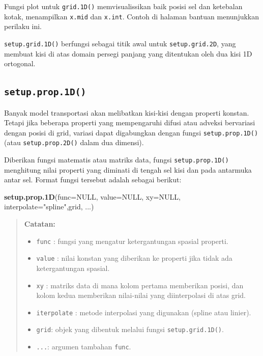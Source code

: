 \documentclass[]{book}
\newenvironment{Shaded}{\begin{snugshade}}{\end{snugshade}}
\newcommand{\DataTypeTok}[1]{\textcolor[rgb]{0.13,0.29,0.53}{#1}}
\newcommand{\KeywordTok}[1]{\textcolor[rgb]{0.13,0.29,0.53}{\textbf{#1}}}
\newcommand{\NormalTok}[1]{#1}
\newcommand{\OtherTok}[1]{\textcolor[rgb]{0.56,0.35,0.01}{#1}}
\newcommand{\StringTok}[1]{\textcolor[rgb]{0.31,0.60,0.02}{#1}}
\providecommand{\tightlist}{%
  \setlength{\itemsep}{0pt}\setlength{\parskip}{0pt}}
\theoremstyle{definition}
\theoremstyle{definition}
\theoremstyle{definition}
\theoremstyle{remark}
\begin{document}
Fungsi plot untuk \texttt{grid.1D()} memvisualissikan baik posisi sel dan ketebalan kotak, menampilkan \texttt{x.mid} dan \texttt{x.int}. Contoh di halaman bantuan menunjukkan perilaku ini.

\texttt{setup.grid.1D()} berfungsi sebagai titik awal untuk \texttt{setup.grid.2D}, yang membuat kisi di atas domain persegi panjang yang ditentukan oleh dua kisi 1D ortogonal.

\hypertarget{setup.prop.1d}{%
\subsection{\texorpdfstring{\texttt{setup.prop.1D()}}{setup.prop.1D()}}\label{setup.prop.1d}}

Banyak model transportasi akan melibatkan kisi-kisi dengan properti konstan. Tetapi jika beberapa properti yang mempengaruhi difusi atau adveksi bervariasi dengan posisi di grid, variasi dapat digabungkan dengan fungsi \texttt{setup.prop.1D()} (atau \texttt{setup.prop.2D()} dalam dua dimensi).

Diberikan fungsi matematis atau matriks data, fungsi \texttt{setup.prop.1D()} menghitung nilai properti yang diminati di tengah sel kisi dan pada antarmuka antar sel. Format fungsi tersebut adalah sebagai berikut:

\begin{Shaded}
\begin{Highlighting}[]
\KeywordTok{setup.prop.1D}\NormalTok{(}\DataTypeTok{func=}\OtherTok{NULL}\NormalTok{, }\DataTypeTok{value=}\OtherTok{NULL}\NormalTok{, }\DataTypeTok{xy=}\OtherTok{NULL}\NormalTok{,}
              \DataTypeTok{interpolate=}\StringTok{"spline"}\NormalTok{,grid, ...)}
\end{Highlighting}
\end{Shaded}

\begin{quote}
\textbf{Catatan:}

\begin{itemize}
\tightlist
\item
  \texttt{func} : fungsi yang mengatur ketergantungan spasial properti.
\item
  \texttt{value} : nilai konstan yang diberikan ke properti jika tidak ada ketergantungan spasial.
\item
  \texttt{xy} : matriks data di mana kolom pertama memberikan posisi, dan kolom kedua memberikan nilai-nilai yang diinterpolasi di atas grid.
\item
  \texttt{iterpolate} : metode interpolasi yang digunakan (spline atau linier).
\item
  \texttt{grid}: objek yang dibentuk melalui fungsi \texttt{setup.grid.1D()}.
\item
  \texttt{...}: argumen tambahan \texttt{func}.
\end{itemize}
\end{quote}
\end{document}

